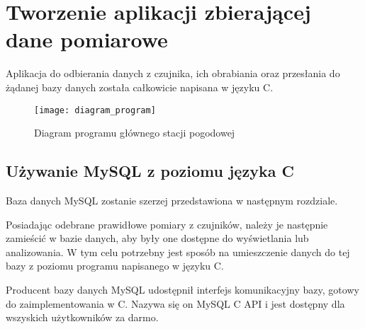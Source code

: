 \chapter{Tworzenie aplikacji zbierającej dane pomiarowe}

Aplikacja do odbierania danych z czujnika, ich obrabiania oraz przesłania do żądanej bazy danych została całkowicie napisana w języku C.

\begin{figure}[h]
\centering
\texttt{[image: diagram\_program]}
\caption{Diagram programu głównego stacji pogodowej}
\label{fig:diagram_program}
\end{figure}

\section*{Używanie MySQL z poziomu języka C}
Baza danych MySQL zostanie szerzej przedstawiona w następnym rozdziale.

Posiadając odebrane prawidłowe pomiary z czujników, należy je następnie zamieścić w bazie danych, aby były one dostępne do wyświetlania lub analizowania. W tym celu potrzebny jest sposób na umieszczenie danych do tej bazy z poziomu programu napisanego w języku C.

Producent bazy danych MySQL udostępnił interfejs komunikacyjny bazy, gotowy do zaimplementowania w C. Nazywa się on MySQL C API i jest dostępny dla wszyskich użytkowników za darmo.


